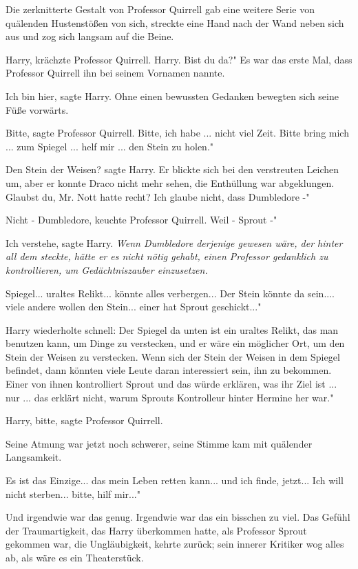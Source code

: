 Die zerknitterte Gestalt von Professor Quirrell gab eine weitere Serie von
quälenden Hustenstößen von sich, streckte eine Hand nach der Wand neben sich aus
und zog sich langsam auf die Beine.

\glqq Harry\grqq{}, krächzte Professor Quirrell. \glqq Harry. Bist du da?" Es
war das erste Mal, dass Professor Quirrell ihn bei seinem Vornamen nannte.

\glqq Ich bin hier\grqq{}, sagte Harry. Ohne einen bewussten Gedanken bewegten
sich seine Füße vorwärts.

\glqq Bitte\grqq{}, sagte Professor Quirrell. \glqq Bitte, ich habe ... nicht
viel Zeit. Bitte bring mich ... zum Spiegel ... helf mir ... den Stein zu
holen."

\glqq Den Stein der Weisen?\grqq{} sagte Harry. Er blickte sich bei den
verstreuten Leichen um, aber er konnte Draco nicht mehr sehen, die Enthüllung
war abgeklungen. \glqq Glaubst du, Mr. Nott hatte recht? Ich glaube nicht, dass
Dumbledore -"

\glqq Nicht - Dumbledore\grqq{}, keuchte Professor Quirrell. \glqq Weil - Sprout
-"

\glqq Ich verstehe\grqq{}, sagte Harry. \emph{Wenn Dumbledore derjenige gewesen
wäre, der hinter all dem steckte, hätte er es nicht nötig gehabt, einen
Professor gedanklich zu kontrollieren, um Gedächtniszauber einzusetzen.}

\glqq Spiegel... uraltes Relikt... könnte alles verbergen... Der Stein könnte da
sein.... viele andere wollen den Stein... einer hat Sprout geschickt..."

Harry wiederholte schnell: \glqq Der Spiegel da unten ist ein uraltes Relikt,
das man benutzen kann, um Dinge zu verstecken, und er wäre ein möglicher Ort, um
den Stein der Weisen zu verstecken. Wenn sich der Stein der Weisen in dem
Spiegel befindet, dann könnten viele Leute daran interessiert sein, ihn zu
bekommen. Einer von ihnen kontrolliert Sprout und das würde erklären, was ihr
Ziel ist ... nur ... das erklärt nicht, warum Sprouts Kontrolleur hinter Hermine
her war."

\glqq Harry, bitte\grqq{}, sagte Professor Quirrell.

Seine Atmung war jetzt noch schwerer, seine Stimme kam mit quälender
Langsamkeit.

\glqq Es ist das Einzige... das mein Leben retten kann... und ich finde,
jetzt... Ich will nicht sterben... bitte, hilf mir..."

Und irgendwie war das genug. Irgendwie war das ein bisschen zu viel. Das Gefühl
der Traumartigkeit, das Harry überkommen hatte, als Professor Sprout gekommen
war, die Ungläubigkeit, kehrte zurück; sein innerer Kritiker wog alles ab, als
wäre es ein Theaterstück.

